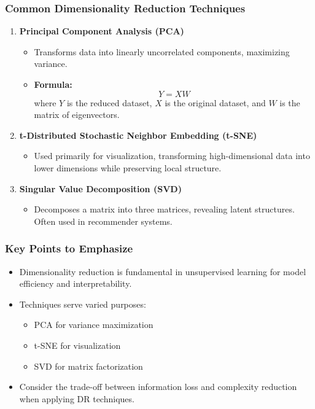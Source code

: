 \documentclass[aspectratio=169]{beamer}
\begin{document}
\begin{frame}[fragile]
    \frametitle{Common Dimensionality Reduction Techniques}
    \begin{enumerate}
        \item \textbf{Principal Component Analysis (PCA)}
            \begin{itemize}
                \item Transforms data into linearly uncorrelated components, maximizing variance.
                \item \textbf{Formula:} 
                \begin{equation}
                Y = XW
                \end{equation}
                where \(Y\) is the reduced dataset, \(X\) is the original dataset, and \(W\) is the matrix of eigenvectors.
            \end{itemize}

        \item \textbf{t-Distributed Stochastic Neighbor Embedding (t-SNE)}
            \begin{itemize}
                \item Used primarily for visualization, transforming high-dimensional data into lower dimensions while preserving local structure.
            \end{itemize}
            
        \item \textbf{Singular Value Decomposition (SVD)}
            \begin{itemize}
                \item Decomposes a matrix into three matrices, revealing latent structures. Often used in recommender systems.
            \end{itemize}
    \end{enumerate}
\end{frame}

\begin{frame}[fragile]
    \frametitle{Key Points to Emphasize}
    \begin{itemize}
        \item Dimensionality reduction is fundamental in unsupervised learning for model efficiency and interpretability.
        \item Techniques serve varied purposes:
            \begin{itemize}
                \item PCA for variance maximization
                \item t-SNE for visualization
                \item SVD for matrix factorization
            \end{itemize}
        \item Consider the trade-off between information loss and complexity reduction when applying DR techniques.
    \end{itemize}
\end{frame}
\end{document}
